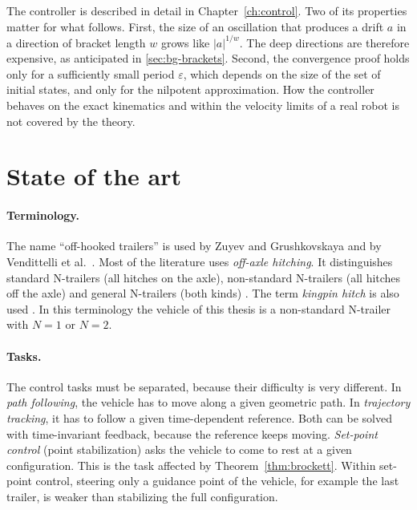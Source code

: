 The controller is described in detail in Chapter~\ref{ch:control}. Two of its
properties matter for what follows. First, the size of an oscillation that
produces a drift $a$ in a direction of bracket length $w$ grows like $|a|^{1/w}$.
The deep directions are therefore expensive, as anticipated in
\cref{sec:bg-brackets}. Second, the convergence proof holds only for a
sufficiently small period $\varepsilon$, which depends on the size of the set of
initial states, and only for the nilpotent approximation. How the controller
behaves on the exact kinematics and within the velocity limits of a real robot
is not covered by the theory.

\section{State of the art}
\label{sec:bg-state}

\paragraph{Terminology.}
The name ``off-hooked trailers'' is used by Zuyev and Grushkovskaya
\cite{zuyev2024} and by Vendittelli et al.\ \cite{vendittelli1998}. Most of the
literature uses \emph{off-axle hitching}. It distinguishes standard N-trailers
(all hitches on the axle), non-standard N-trailers (all hitches off the axle)
and general N-trailers (both kinds)
\cite{michalek2014pf,michalek2014tcst}. The term \emph{kingpin hitch} is also
used \cite{altafini2001}. In this terminology the vehicle of this thesis is a
non-standard N-trailer with $N=1$ or $N=2$.

\paragraph{Tasks.}
The control tasks must be separated, because their difficulty is very
different. In \emph{path following}, the vehicle has to move along a given
geometric path. In \emph{trajectory tracking}, it has to follow a given
time-dependent reference. Both can be solved with time-invariant feedback,
because the reference keeps moving. \emph{Set-point control} (point
stabilization) asks the vehicle to come to rest at a given configuration. This
is the task affected by Theorem~\ref{thm:brockett}. Within set-point control,
steering only a guidance point of the vehicle, for example the last trailer, is
weaker than stabilizing the full configuration.

